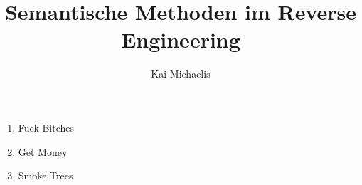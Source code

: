 \documentclass[xetex,mathserif,serif]{beamer}
\title{Semantische Methoden im Reverse Engineering}
\author{Kai Michaelis}
\begin{document}
	\frame{\titlepage}
	\begin{frame}
		\begin{enumerate}
			\item Fuck Bitches
			\item Get Money
			\item Smoke Trees
		\end{enumerate}
	\end{frame}
	\begin{frame}
		\blindtext
	\end{frame}
\end{document}

